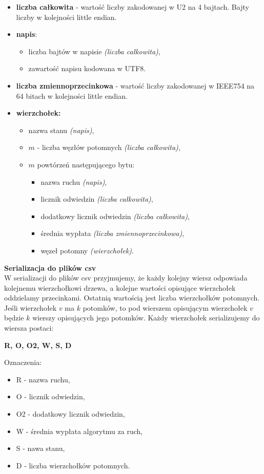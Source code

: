 \documentclass{article}
\begin{document}
	\begin{itemize}
		\item \textbf{liczba całkowita} - wartość liczby zakodowanej w U2 na 4 bajtach. Bajty liczby w kolejności little endian.
		\item \textbf{napis}:
		\begin{itemize}
			\item liczba bajtów w napisie \textit{(liczba całkowita)},
			\item zawartość napisu kodowana w UTF8.
		\end{itemize}
		\item \textbf{liczba zmiennoprzecinkowa} - wartość liczby zakodowanej w IEEE754 na 64 bitach w kolejności little endian.
		\item \textbf{wierzchołek:}
		\begin{itemize}
			\item nazwa stanu \textit{(napis)},
			\item $m$ - liczba węzłów potomnych \textit{(liczba całkowita)},
			\item $m$ powtórzeń następującego bytu:
			\begin{itemize}
				\item nazwa ruchu \textit{(napis)},
				\item licznik odwiedzin \textit{(liczba całkowita)},
				\item dodatkowy licznik odwiedzin \textit{(liczba całkowita)},
				\item średnia wypłata \textit{(liczba zmiennoprzecinkowa)},
				\item węzeł potomny \textit{(wierzchołek)}. \\
			\end{itemize}
		\end{itemize}
	\end{itemize}
	
	
	\noindent \textbf{\large Serializacja do plików csv} \\
	W serializacji do plików csv przyjmujemy, że każdy kolejny wiersz odpowiada kolejnemu wierzchołkowi drzewa, a kolejne wartości opisujące wierzchołek oddzielamy przecinkami. Ostatnią wartością jest liczba wierzchołków potomnych. Jeśli wierzchołek $v$ ma $k$ potomków, to pod wierszem opisującym wierzchołek $v$ będzie $k$ wierszy opisujących jego potomków. Każdy wierzchołek serializujemy do wiersza postaci:
	\begin{center}
		\textbf{R, O, O2, W, S, D}
	\end{center}
	Oznaczenia:
	\begin{itemize}
		\item R - nazwa ruchu,
		\item O - licznik odwiedzin,
		\item O2 - dodatkowy licznik odwiedzin,
		\item W - średnia wypłata algorytmu za ruch,
		\item S - nawa stanu,
		\item D - liczba wierzchołków potomnych.
	\end{itemize}
\end{document}
